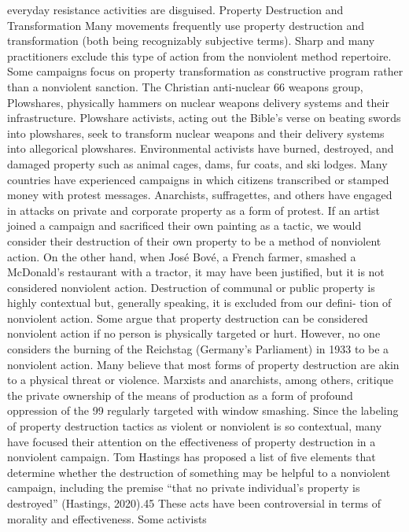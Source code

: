 \documentclass[twoside,a4paper,12pt,fleqn,openany]{extbook}
\begin{document}
everyday resistance activities are disguised.
Property Destruction and Transformation
Many movements frequently use property destruction and transformation (both being
recognizably subjective terms). Sharp and many practitioners exclude this type of action
from the nonviolent method repertoire. Some campaigns focus on property transformation
as constructive program rather than a nonviolent sanction. The Christian anti-nuclear
66
weapons group, Plowshares, physically hammers on nuclear weapons delivery systems
and their infrastructure. Plowshare activists, acting out the Bible’s verse on beating swords
into plowshares, seek to transform nuclear weapons and their delivery systems into
allegorical plowshares.
Environmental activists have burned, destroyed, and damaged property such as animal
cages, dams, fur coats, and ski lodges. Many countries have experienced campaigns in which
citizens transcribed or stamped money with protest messages. Anarchists, suffragettes, and
others have engaged in attacks on private and corporate property as a form of protest.
If an artist joined a campaign and sacrificed their own painting as a tactic, we would
consider their destruction of their own property to be a method of nonviolent action. On the
other hand, when José Bové, a French farmer, smashed a McDonald’s restaurant with a tractor,
it may have been justified, but it is not considered nonviolent action. Destruction of communal
or public property is highly contextual but, generally speaking, it is excluded from our defini-
tion of nonviolent action.
Some argue that property destruction can be considered nonviolent action if no person
is physically targeted or hurt. However, no one considers the burning of the Reichstag
(Germany’s Parliament) in 1933 to be a nonviolent action. Many believe that most forms of
property destruction are akin to a physical threat or violence. Marxists and anarchists, among
others, critique the private ownership of the means of production as a form of profound
oppression of the 99%
regularly targeted with window smashing.
Since the labeling of property destruction tactics as violent or nonviolent is so contextual,
many have focused their attention on the effectiveness of property destruction in a nonviolent
campaign. Tom Hastings has proposed a list of five elements that determine whether the
destruction of something may be helpful to a nonviolent campaign, including the premise
“that no private individual’s property is destroyed” (Hastings, 2020).45
These acts have been controversial in terms of morality and effectiveness. Some activists
\end{document}
